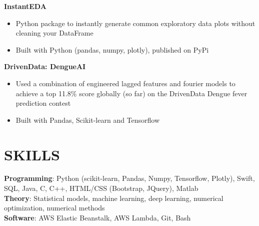 \documentclass[margin]{res}
\begin{document}
\begin{resume}
    \textbf{InstantEDA}
    \begin{itemize}
        \item Python package to instantly generate common exploratory data plots without cleaning your DataFrame
        \item Built with Python (pandas, numpy, plotly), published on PyPi
    \end{itemize}\vspace*{-8pt}
    \textbf{DrivenData: DengueAI}
    \begin{itemize}
        \item Used a combination of engineered lagged features and fourier models to achieve a top 11.8\% score globally (so far) on the DrivenData Dengue fever prediction contest
        \item Built with Pandas, Scikit-learn and Tensorflow
    \end{itemize}\vspace*{-8pt}
\section{SKILLS}
    \textbf{Programming}: Python (scikit-learn, Pandas, Numpy, Tensorflow, Plotly), Swift, SQL, Java, C, C++, HTML/CSS (Bootstrap, JQuery), Matlab\\
    \textbf{Theory}: Statistical models, machine learning, deep learning, numerical optimization, numerical methods \\
    \textbf{Software}: AWS Elastic Beanstalk, AWS Lambda, Git, Bash 
\end{resume}
\end{document}
